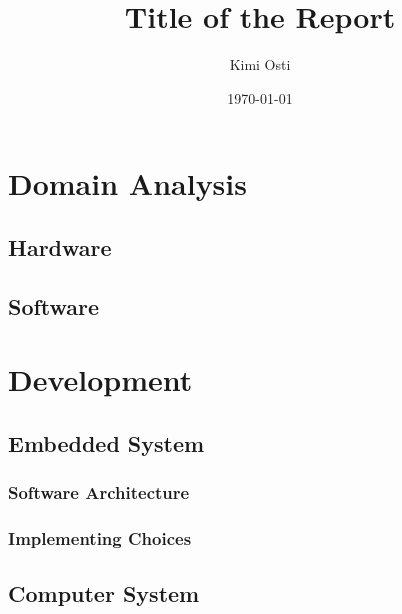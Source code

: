 \documentclass[a4paper,12pt]{report}
\title{Title of the Report}
\author{Kimi Osti}
\date{\today}
\begin{document}
	
	\maketitle
	
	\begin{abstract}
		
	\end{abstract}
	
	\tableofcontents
	
	\chapter{Domain Analysis}
	
	\section{Hardware}
	
	\section{Software}
	
	\chapter{Development}
	
	\section{Embedded System}
	
	\subsection{Software Architecture}
	
	\subsection{Implementing Choices}
	
	\section{Computer System}
	
\end{document}
